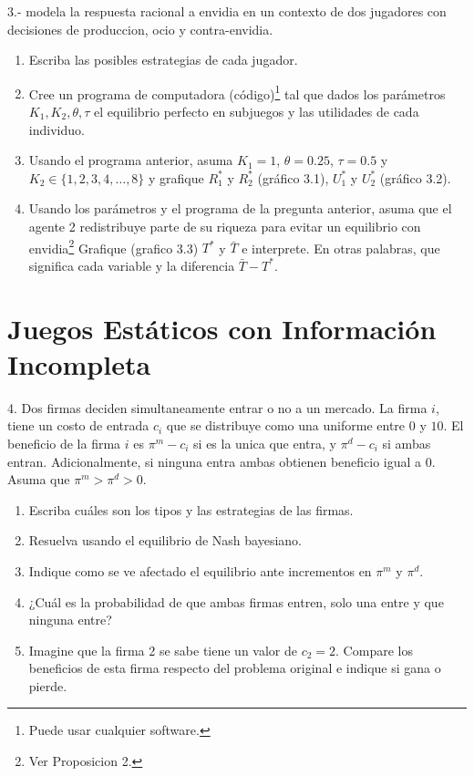 \documentclass[11pt]{article}
\begin{document}
3.- \cite{gershman2015economic} modela la respuesta racional a envidia en un contexto de dos jugadores con decisiones de produccion, ocio y contra-envidia.
\begin{enumerate}
	\item Escriba las posibles estrategias de cada jugador.
	\item Cree un programa de computadora (c\'odigo)\footnote{Puede usar cualquier software.} tal que dados los par\'ametros $K_{1}, K_{2}, \theta, \tau$ el equilibrio perfecto en subjuegos y las utilidades de cada individuo.
	\item Usando el programa anterior, asuma $K_{1} = 1$, $\theta = 0.25$, $\tau = 0.5$ y $K_{2} \in \{1, 2, 3, 4, \dots, 8\}$ y grafique $R_{1}^{*}$ y $R_{2}^{*}$ (gr\'afico 3.1), $U_{1}^{*}$ y $U_{2}^{*}$ (gr\'afico 3.2).
	\item Usando los par\'ametros y el programa de la pregunta anterior, asuma que el agente 2 redistribuye parte de su riqueza para evitar un equilibrio con envidia\footnote{Ver Proposicion 2.} Grafique (grafico 3.3) $T^{*}$ y $\bar{T}$ e interprete. En otras palabras, que significa cada variable y la diferencia $\bar{T} - T^{*}$.
\end{enumerate}


\section*{Juegos Est\'aticos con Informaci\'on Incompleta}

4. Dos firmas deciden simultaneamente entrar o no a un mercado. La firma $i$, tiene un costo de entrada $c_{i}$ que se distribuye como una uniforme entre $0$ y $10$. El beneficio de la firma $i$ es $\pi^{m} - c_{i}$ si es la unica que entra, y $\pi^{d} -c_{i}$ si ambas entran. Adicionalmente, si ninguna entra ambas obtienen beneficio igual a $0$. Asuma que $\pi^{m} > \pi^{d} > 0$.
\begin{enumerate}
	\item Escriba cu\'ales son los tipos y las estrategias de las firmas.
	\item Resuelva usando el equilibrio de Nash bayesiano.
	\item Indique como se ve afectado el equilibrio ante incrementos en $\pi^{m}$ y $\pi^{d}$.
	\item ¿Cu\'al es la probabilidad de que ambas firmas entren, solo una entre y que ninguna entre?
	\item Imagine que la firma 2 se sabe tiene un valor de $c_{2} = 2$. Compare los beneficios de esta firma respecto del problema original e indique si gana o pierde.
\end{enumerate}



\end{document}
